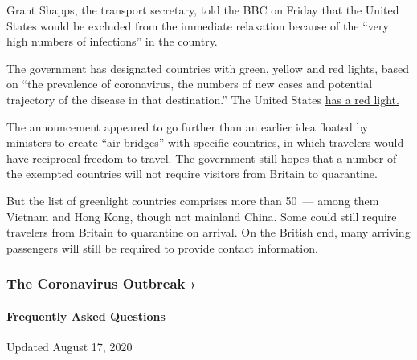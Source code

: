 Grant Shapps, the transport secretary, told the BBC on Friday that the
United States would be excluded from the immediate relaxation because of
the ``very high numbers of infections'' in the country.

The government has designated countries with green, yellow and red
lights, based on ``the prevalence of coronavirus, the numbers of new
cases and potential trajectory of the disease in that destination.'' The
United States
\href{https://www.nytimes3xbfgragh.onion/2020/07/03/world/coronavirus-updates.html?action=click\&module=Top\%20Stories\&pgtype=Homepage}{has
a red light.}

The announcement appeared to go further than an earlier idea floated by
ministers to create ``air bridges'' with specific countries, in which
travelers would have reciprocal freedom to travel. The government still
hopes that a number of the exempted countries will not require visitors
from Britain to quarantine.

But the list of greenlight countries comprises more than 50~--- among
them Vietnam and Hong Kong, though not mainland China. Some could still
require travelers from Britain to quarantine on arrival. On the British
end, many arriving passengers will still be required to provide contact
information.

\href{https://www.nytimes3xbfgragh.onion/news-event/coronavirus?action=click\&pgtype=Article\&state=default\&region=MAIN_CONTENT_3\&context=storylines_faq}{}

\hypertarget{the-coronavirus-outbreak-}{%
\subsubsection{The Coronavirus Outbreak
›}\label{the-coronavirus-outbreak-}}

\hypertarget{frequently-asked-questions}{%
\paragraph{Frequently Asked
Questions}\label{frequently-asked-questions}}

Updated August 17, 2020

